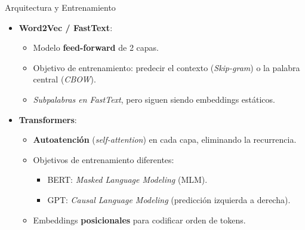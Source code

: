 \documentclass{beamer}
\begin{document}
\begin{frame}{Arquitectura y Entrenamiento}
  \begin{itemize}
    \item \textbf{Word2Vec / FastText}:
      \begin{itemize}
        \item Modelo \textbf{feed-forward} de 2 capas.
        \item Objetivo de entrenamiento: predecir el contexto (\textit{Skip-gram}) o la palabra central (\textit{CBOW}).
        \item \textit{Subpalabras en FastText}, pero siguen siendo embeddings estáticos.
      \end{itemize}

    \vspace{0.5em}
    \item \textbf{Transformers}:
      \begin{itemize}
        \item \textbf{Autoatención} (\textit{self-attention}) en cada capa, eliminando la recurrencia.
        \item Objetivos de entrenamiento diferentes:
          \begin{itemize}
            \item BERT: \textit{Masked Language Modeling} (MLM).
            \item GPT: \textit{Causal Language Modeling} (predicción izquierda a derecha).
          \end{itemize}
        \item Embeddings \textbf{posicionales} para codificar orden de tokens.
      \end{itemize}
  \end{itemize}
\end{frame}
\end{document}
